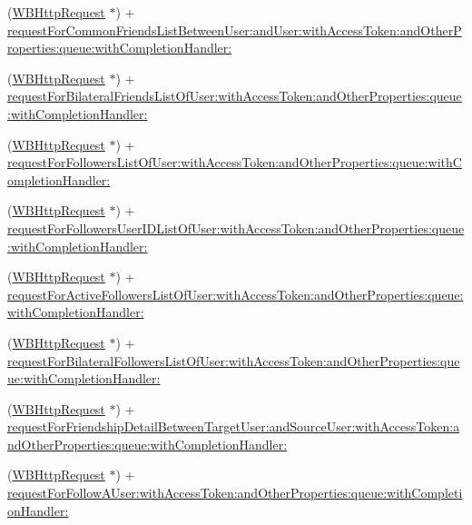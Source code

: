 \begin{DoxyCompactItemize}
\item 
(\mbox{\hyperlink{interface_w_b_http_request}{W\+B\+Http\+Request}} $\ast$) + \mbox{\hyperlink{category_w_b_http_request_07_weibo_user_08_a869234d6cc01353dcfc8f0f47ad06f5c}{request\+For\+Common\+Friends\+List\+Between\+User\+:and\+User\+:with\+Access\+Token\+:and\+Other\+Properties\+:queue\+:with\+Completion\+Handler\+:}}
\item 
(\mbox{\hyperlink{interface_w_b_http_request}{W\+B\+Http\+Request}} $\ast$) + \mbox{\hyperlink{category_w_b_http_request_07_weibo_user_08_a8266e8e1c5230407f29ee63e05e98b38}{request\+For\+Bilateral\+Friends\+List\+Of\+User\+:with\+Access\+Token\+:and\+Other\+Properties\+:queue\+:with\+Completion\+Handler\+:}}
\item 
(\mbox{\hyperlink{interface_w_b_http_request}{W\+B\+Http\+Request}} $\ast$) + \mbox{\hyperlink{category_w_b_http_request_07_weibo_user_08_a0437dae63fa8fe40c7c5b323b45e0094}{request\+For\+Followers\+List\+Of\+User\+:with\+Access\+Token\+:and\+Other\+Properties\+:queue\+:with\+Completion\+Handler\+:}}
\item 
(\mbox{\hyperlink{interface_w_b_http_request}{W\+B\+Http\+Request}} $\ast$) + \mbox{\hyperlink{category_w_b_http_request_07_weibo_user_08_a62303f19ac35267cff108384061f1de7}{request\+For\+Followers\+User\+I\+D\+List\+Of\+User\+:with\+Access\+Token\+:and\+Other\+Properties\+:queue\+:with\+Completion\+Handler\+:}}
\item 
(\mbox{\hyperlink{interface_w_b_http_request}{W\+B\+Http\+Request}} $\ast$) + \mbox{\hyperlink{category_w_b_http_request_07_weibo_user_08_a158110b5d079d1ddd7baae029a8a36fb}{request\+For\+Active\+Followers\+List\+Of\+User\+:with\+Access\+Token\+:and\+Other\+Properties\+:queue\+:with\+Completion\+Handler\+:}}
\item 
(\mbox{\hyperlink{interface_w_b_http_request}{W\+B\+Http\+Request}} $\ast$) + \mbox{\hyperlink{category_w_b_http_request_07_weibo_user_08_a5c4b501746e378232db99ae045e49889}{request\+For\+Bilateral\+Followers\+List\+Of\+User\+:with\+Access\+Token\+:and\+Other\+Properties\+:queue\+:with\+Completion\+Handler\+:}}
\item 
(\mbox{\hyperlink{interface_w_b_http_request}{W\+B\+Http\+Request}} $\ast$) + \mbox{\hyperlink{category_w_b_http_request_07_weibo_user_08_a6e438b749b6311301808d7ae0923d7c3}{request\+For\+Friendship\+Detail\+Between\+Target\+User\+:and\+Source\+User\+:with\+Access\+Token\+:and\+Other\+Properties\+:queue\+:with\+Completion\+Handler\+:}}
\item 
(\mbox{\hyperlink{interface_w_b_http_request}{W\+B\+Http\+Request}} $\ast$) + \mbox{\hyperlink{category_w_b_http_request_07_weibo_user_08_a857eebccc3b26b8d7c5bbc38a3ae2627}{request\+For\+Follow\+A\+User\+:with\+Access\+Token\+:and\+Other\+Properties\+:queue\+:with\+Completion\+Handler\+:}}

\end{DoxyCompactItemize}
